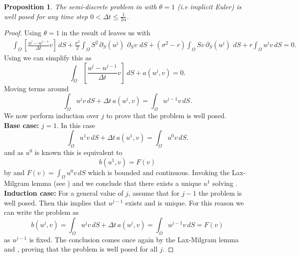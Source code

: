 \documentclass{article}
\newtheorem{prop}[thm]{Proposition}
\newcommand{\argwrapsquare}[1]{\left[#1\right]}
\newcommand{\intS}[1]{\ensuremath{\int_{\Omega}#1 \, dS}}
\newcommand{\intSlong}[1]{\intS{\argwrapsquare{#1}}}
\newcommand{\darg}[2]{\ensuremath{\, \partial_{#2}#1} \, }
\newcommand{\dS}[1]{\ensuremath{\darg{#1}{S}}}
\newcommand{\dSv}{\dS{v}}
\newcommand{\sigmafrac}{\ensuremath{\frac{\sigma^2}{2}}}
\begin{document}
\begin{prop}\label{prop:lax_milgram}
    The semi-discrete problem in  with $\theta = 1$ (i.e implicit Euler) is well posed for any time step $0<\Delta t \leq \frac{1}{2 \alpha}$.
\end{prop}
\begin{proof}
    Using $\theta = 1$ in the result of  leaves us with
    \begin{align*}
        &\intSlong{\frac{u^{j} - u^{j-1}}{\Delta t}  v} +\sigmafrac \intS{S^2 \dS{\left(u^{j}\right)} \dSv} + (\sigma^2 - r) \intS{S v \dS{\left(u^{j}\right)}} + r \intS{u^{j}v} =0.
        \end{align*}
    Using  we can simplify this as
    \begin{equation*}
    \intSlong{\frac{u^{j} - u^{j-1}}{\Delta t} v} + a(u^{j},v) = 0.
    \end{equation*}
    Moving terms around
    \begin{equation*}
        \intS{u^{j}v} + \Delta t \,a(u^{j},v) = \intS{u^{j-1}v}.
    \end{equation*}
    We now perform induction over $j$ to prove that the problem is well posed.\\
    \textbf{Base case:} $j = 1$. In this case
    \begin{equation*}
        \intS{u^{1}v} + \Delta t \,a(u^{1},v) = \intS{u^{0}v}.
    \end{equation*}
    and as $u^0$ is known this is equivalent to 
    \begin{equation}\label{eq:base_case}
        b(u^{1}, v) = F(v)
    \end{equation}
    by  and $F(v)=\intS{u^{0}v}$ which is bounded and continuous. Invoking the Lax-Milgram lemma (see ) and  we conclude that there exists a unique $u^1$ solving .\\
    \textbf{Induction case: } For a general value of $j$, assume that for $j-1$ the problem is well posed. Then this implies that $u^{j-1}$ exists and is unique. For this reason we can write the problem as
    \begin{equation*}
        b(u^{j},v)=\intS{u^{j}v} + \Delta t \,a(u^{j},v) = \intS{u^{j-1}v} = F(v)
    \end{equation*}
     as $u^{j-1}$ is fixed. The conclusion comes once again by the Lax-Milgram lemma  and , proving that the problem is well posed for all $j$. \qedhere
    
    
\end{proof}
\end{document}
